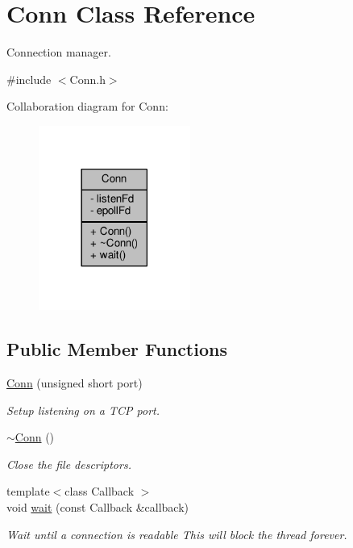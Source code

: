 \hypertarget{classConn}{}\section{Conn Class Reference}
\label{classConn}


Connection manager.  




{\ttfamily \#include $<$Conn.\+h$>$}



Collaboration diagram for Conn\+:
\nopagebreak
\begin{figure}[H]
\begin{center}
\leavevmode
\includegraphics[width=141pt]{classConn__coll__graph}
\end{center}
\end{figure}
\subsection*{Public Member Functions}
\begin{DoxyCompactItemize}
\item 
\hyperlink{classConn_a7312553a7ce3efd712427ccd5a0106c6}{Conn} (unsigned short port)
\begin{DoxyCompactList}\small\item\em Setup listening on a T\+CP port. \end{DoxyCompactList}\item 
\hyperlink{classConn_a45fa096c27a1cdbeb295c903045ce071}{$\sim$\+Conn} ()
\begin{DoxyCompactList}\small\item\em Close the file descriptors. \end{DoxyCompactList}\item 
{\footnotesize template$<$class Callback $>$ }\\void \hyperlink{classConn_a1c06e5cf18d612c261b49198c99fa0d6}{wait} (const Callback \&callback)
\begin{DoxyCompactList}\small\item\em Wait until a connection is readable This will block the thread forever. \end{DoxyCompactList}\end{DoxyCompactItemize}
